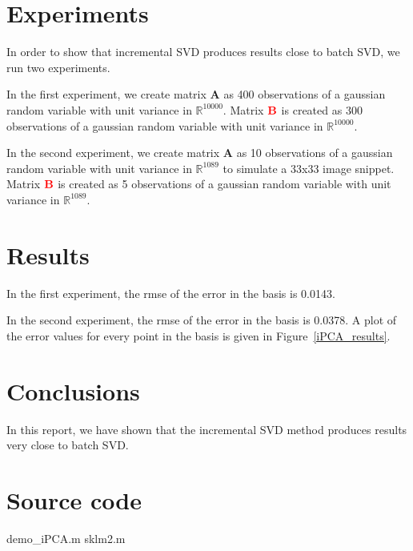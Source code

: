 \cite{2008_JNL_subspaceTRK_Ross}

\section{Experiments}
In order to show that incremental SVD produces results close to batch SVD, we run two experiments.

In the first experiment, we create matrix $\mathbf{A}$ as 400 observations of a gaussian random variable with unit variance in $\mathbb{R}^{10000}$.  Matrix ${\color{red}\mathbf{B}}$ is created as 300 observations of a gaussian random variable with unit variance in $\mathbb{R}^{10000}$.  

In the second experiment, we create matrix $\mathbf{A}$ as 10 observations of a gaussian random variable with unit variance in $\mathbb{R}^{1089}$ to simulate a 33x33 image snippet.  Matrix ${\color{red}\mathbf{B}}$ is created as 5 observations of a gaussian random variable with unit variance in $\mathbb{R}^{1089}$. 



\section{Results}
In the first experiment, the rmse of the error in the basis is 0.0143.

In the second experiment, the rmse of the error in the basis is 0.0378.  A plot of the error values for every point in the basis is given in Figure~\ref{iPCA_results}.




\section{Conclusions}
In this report, we have shown that the incremental SVD method produces results very close to batch SVD.


\appendix
\section{Source code}
\scriptsize
	{demo_iPCA.m}
		{sklm2.m}

\normalsize


